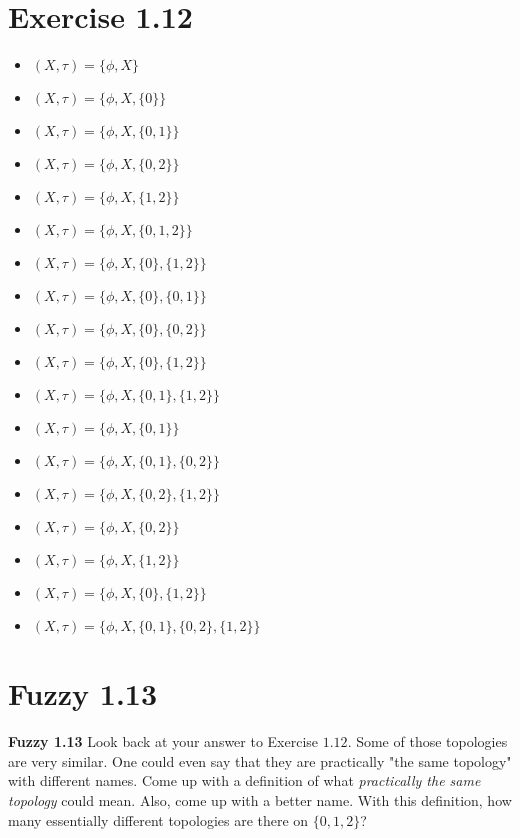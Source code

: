 \documentclass{report}
\begin{document}
\section{Exercise 1.12}

\sol
\begin{itemize}
  \item $(X, \tau) = \{\phi, X\}$
  \item $(X, \tau) = \{\phi, X, \{0\}\}$
  \item $(X, \tau) = \{\phi, X, \{0, 1\}\}$
  \item $(X, \tau) = \{\phi, X, \{0, 2\}\}$
  \item $(X, \tau) = \{\phi, X, \{1, 2\}\}$
  \item $(X, \tau) = \{\phi, X, \{0, 1, 2\}\}$
  \item $(X, \tau) = \{\phi, X, \{0\}, \{1, 2\}\}$
  \item $(X, \tau) = \{\phi, X, \{0\}, \{0, 1\}\}$
  \item $(X, \tau) = \{\phi, X, \{0\}, \{0, 2\}\}$
  \item $(X, \tau) = \{\phi, X, \{0\}, \{1, 2\}\}$
  \item $(X, \tau) = \{\phi, X, \{0, 1\}, \{1, 2\}\}$
  \item $(X, \tau) = \{\phi, X, \{0, 1\}\}$
  \item $(X, \tau) = \{\phi, X, \{0, 1\}, \{0, 2\}\}$
  \item $(X, \tau) = \{\phi, X, \{0, 2\}, \{1, 2\}\}$
  \item $(X, \tau) = \{\phi, X, \{0, 2\}\}$
  \item $(X, \tau) = \{\phi, X, \{1, 2\}\}$
  \item $(X, \tau) = \{\phi, X, \{0\}, \{1, 2\}\}$
  \item $(X, \tau) = \{\phi, X, \{0, 1\}, \{0, 2\}, \{1, 2\}\}$
\end{itemize}


\section{Fuzzy 1.13}

\textbf{Fuzzy 1.13} Look back at your answer to Exercise $1.12$. Some of those topologies are very similar. One could even say that they are practically "the same topology" with different names. Come up with a definition of what \textit{practically the same topology} could mean. Also, come up with a better name. With this definition, how many essentially different topologies are there on $\{0, 1, 2\}$?
\end{document}
